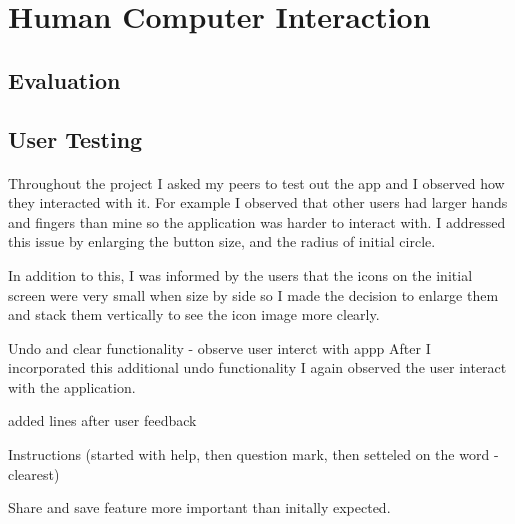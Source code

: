 \documentclass[11pt]{article}
\begin{document}
\newpage
\section{Human Computer Interaction}
    \paragraph{}
    
        \subsection{Evaluation}
            
                \paragraph{}

    \subsection{User Testing}
    
           \paragraph{} Throughout the project I asked my peers to test out the app and I observed how they interacted with it. For example I observed that other users had larger hands and fingers than mine so the application was harder to interact with. I addressed this issue by enlarging the button size, and the radius of initial circle. 
           
           In addition to this, I was informed by the users that the icons on the initial screen were very small when size by side so I made the decision to enlarge them and stack them vertically to see the icon image more clearly. 
           
           Undo and clear functionality - observe user interct with appp
                 After I incorporated this additional undo functionality I again observed the user interact with the application. 
           
           added lines after user feedback
           
           Instructions (started with help, then question mark, then setteled on the word - clearest)
           
           Share and save feature more important than initally expected.
        
\end{document}
